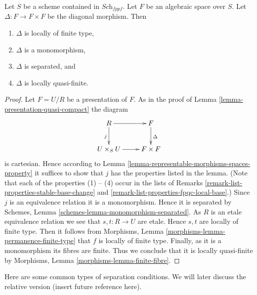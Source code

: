 \begin{lemma}
\label{lemma-properties-diagonal}
Let $S$ be a scheme contained in $\textit{Sch}_{fppf}$.
Let $F$ be an algebraic space over $S$.
Let $\Delta : F \to F \times F$ be the diagonal morphism.
Then
\begin{enumerate}
\item $\Delta$ is locally of finite type,
\item $\Delta$ is a monomorphism,
\item $\Delta$ is separated, and
\item $\Delta$ is locally quasi-finite.
\end{enumerate}
\end{lemma}

\begin{proof}
Let $F = U/R$ be a presentation of $F$.
As in the proof of Lemma \ref{lemma-presentation-quasi-compact} the diagram
$$
\xymatrix{
R \ar[r] \ar[d]_j & F \ar[d]^\Delta \\
U \times_S U \ar[r] & F \times F
}
$$
is cartesian. Hence according to
Lemma \ref{lemma-representable-morphisms-spaces-property}
it suffices to show that $j$ has the properties listed in the lemma.
(Note that each of the properties (1) -- (4) occur in the lists
of Remarks \ref{remark-list-properties-stable-base-change}
and \ref{remark-list-properties-fpqc-local-base}.)
Since $j$ is an equivalence relation it is a monomorphism.
Hence it is separated by
Schemes, Lemma \ref{schemes-lemma-monomorphism-separated}.
As $R$ is an etale equivalence relation we see that
$s, t : R \to U$ are etale. Hence $s, t$ are locally of finite
type. Then it follows from
Morphisms, Lemma \ref{morphisms-lemma-permanence-finite-type} that
$f$ is locally of finite type. Finally, as it is a monomorphism
its fibres are finite. Thus we conclude that it is locally quasi-finite by
Morphisms, Lemma \ref{morphisms-lemma-finite-fibre}.
\end{proof}

\noindent
Here are some common types of separation conditions.
We will later discuss the relative version (insert future
reference here).

